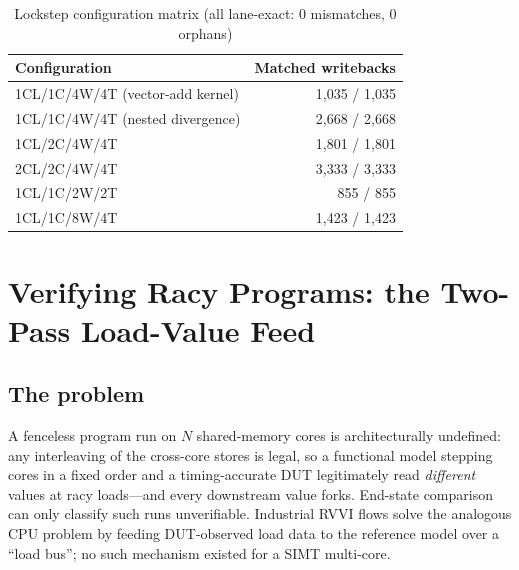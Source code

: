 \documentclass[conference]{IEEEtran}
\begin{document}
\begin{table}[t]
\caption{Lockstep configuration matrix (all lane-exact: 0 mismatches,
0 orphans)}
\label{tab:matrix}
\centering
\small
\begin{tabular}{lr}
\toprule
Configuration & Matched writebacks \\
\midrule
1CL/1C/4W/4T (vector-add kernel) & 1{,}035 / 1{,}035 \\
1CL/1C/4W/4T (nested divergence) & 2{,}668 / 2{,}668 \\
1CL/2C/4W/4T & 1{,}801 / 1{,}801 \\
2CL/2C/4W/4T & 3{,}333 / 3{,}333 \\
1CL/1C/2W/2T & 855 / 855 \\
1CL/1C/8W/4T & 1{,}423 / 1{,}423 \\
\bottomrule
\end{tabular}
\end{table}

\section{Verifying Racy Programs: the Two-Pass Load-Value Feed}
\label{sec:loadfeed}

\subsection{The problem}
A fenceless program run on $N$ shared-memory cores is architecturally
undefined: any interleaving of the cross-core stores is legal, so a
functional model stepping cores in a fixed order and a timing-accurate
DUT legitimately read \emph{different} values at racy loads---and every
downstream value forks. End-state comparison can only classify such
runs unverifiable. Industrial RVVI flows solve the analogous CPU
problem by feeding DUT-observed load data to the reference model over a
``load bus''; no such mechanism existed for a SIMT multi-core.
\end{document}
